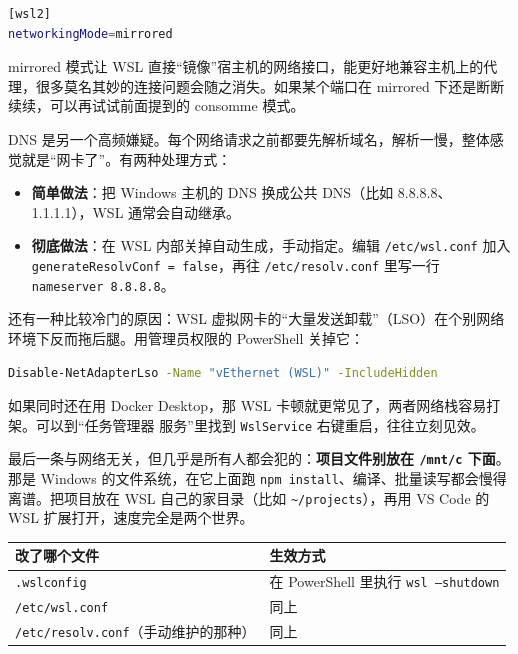 \documentclass[12pt,a4paper]{ctexbook}
\begin{document}
\begin{lstlisting}[language=bash,title={切换为 mirrored 网络模式}]
[wsl2]
networkingMode=mirrored
\end{lstlisting}

mirrored 模式让 WSL 直接``镜像''宿主机的网络接口，能更好地兼容主机上的代理，很多莫名其妙的连接问题会随之消失。如果某个端口在 mirrored 下还是断断续续，可以再试试前面提到的 consomme 模式。

DNS 是另一个高频嫌疑。每个网络请求之前都要先解析域名，解析一慢，整体感觉就是``网卡了''。有两种处理方式：

\begin{itemize}
    \item \textbf{简单做法}：把 Windows 主机的 DNS 换成公共 DNS（比如 8.8.8.8、1.1.1.1），WSL 通常会自动继承。
    \item \textbf{彻底做法}：在 WSL 内部关掉自动生成，手动指定。编辑 \verb|/etc/wsl.conf| 加入 \verb|generateResolvConf = false|，再往 \verb|/etc/resolv.conf| 里写一行 \verb|nameserver 8.8.8.8|。
\end{itemize}

还有一种比较冷门的原因：WSL 虚拟网卡的``大量发送卸载''（LSO）在个别网络环境下反而拖后腿。用管理员权限的 PowerShell 关掉它：

\begin{lstlisting}[language=bash,title={禁用 WSL 虚拟网卡的 LSO}]
Disable-NetAdapterLso -Name "vEthernet (WSL)" -IncludeHidden
\end{lstlisting}

如果同时还在用 Docker Desktop，那 WSL 卡顿就更常见了，两者网络栈容易打架。可以到``任务管理器 \textrightarrow{} 服务''里找到 \verb|WslService| 右键重启，往往立刻见效。

最后一条与网络无关，但几乎是所有人都会犯的：\textbf{项目文件别放在 \texttt{/mnt/c} 下面}。那是 Windows 的文件系统，在它上面跑 \verb|npm install|、编译、批量读写都会慢得离谱。把项目放在 WSL 自己的家目录（比如 \verb|~/projects|），再用 VS Code 的 WSL 扩展打开，速度完全是两个世界。

\begin{center}
\small
\begin{tabular}{|l|l|}
\hline
\textbf{改了哪个文件} & \textbf{生效方式} \\
\hline
\texttt{.wslconfig} & 在 PowerShell 里执行 \texttt{wsl --shutdown} \\
\texttt{/etc/wsl.conf} & 同上 \\
\texttt{/etc/resolv.conf}（手动维护的那种） & 同上 \\
\hline
\end{tabular}
\end{center}
\end{document}
